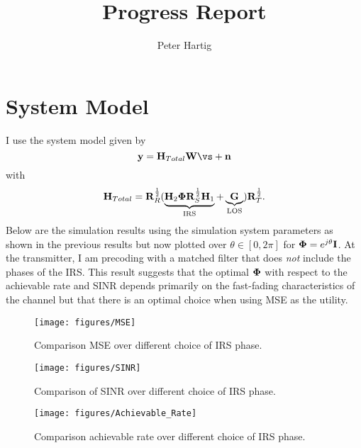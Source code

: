 \documentclass[12pt,a4paper]{report}
\title{Progress Report}
\author{Peter Hartig}
\begin{document}
\maketitle
\tableofcontents

\section{System Model}
I use the system model given by 
\begin{equation}
\vy = \mH_{Total} \mW \vs  + \vn
\end{equation}
with 
	\begin{equation}
	\mathbf{H}_{Total} = \mathbf{R}_{R}^{\frac{1}{2}}(\underbrace{\mathbf{H}_{2}\boldsymbol{\Phi}\mathbf{R}_{S}^{\frac{1}{2}}\mathbf{H}_{1}}_{\text{IRS}} + \underbrace{\mathbf{G}}_{\text{LOS}})\mathbf{R}_{T}^{\frac{1}{2}}.
	\end{equation}
Below are the simulation results using the simulation system parameters as shown in the previous results but now plotted over $\theta \in [0, 2\pi]$ for $\boldsymbol{\Phi} = e^{j\theta}\mathbf{I}$. At the transmitter, I am precoding with a matched filter that does \emph{not} include the phases of the IRS. 
This result suggests that the optimal $\boldsymbol{\Phi}$ with respect to the achievable rate and SINR depends  primarily on the fast-fading characteristics of the channel but that there is an optimal choice when using MSE as the utility.
		\begin{figure}[H]
	\texttt{[image: figures/MSE]}
	  \caption{Comparison MSE over different choice of IRS phase.}
	  	  \label{MSE_correlation}
	\end{figure} 
	
			\begin{figure}[H]
	\texttt{[image: figures/SINR]}
	  \caption{Comparison of SINR over different choice of IRS phase.}
	  	  \label{SINR}
	\end{figure} 
	
			\begin{figure}[H]
	\texttt{[image: figures/Achievable\_Rate]}
	  \caption{Comparison achievable rate over different choice of IRS phase.}
	  	  \label{Achievable_rate}
	\end{figure} 
\end{document}
